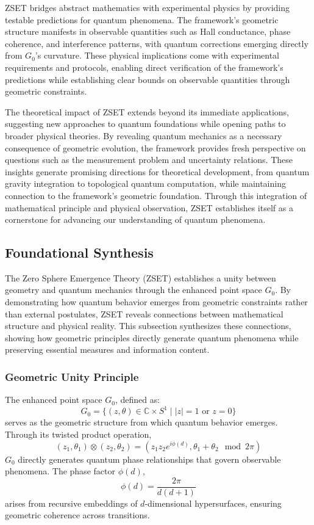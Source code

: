 \documentclass[10pt]{article}
\begin{document}
ZSET bridges abstract mathematics with experimental physics by providing testable predictions for quantum phenomena. The framework's geometric structure manifests in observable quantities such as Hall conductance, phase coherence, and interference patterns, with quantum corrections emerging directly from \(G_0\)'s curvature. These physical implications come with experimental requirements and protocols, enabling direct verification of the framework's predictions while establishing clear bounds on observable quantities through geometric constraints.

The theoretical impact of ZSET extends beyond its immediate applications, suggesting new approaches to quantum foundations while opening paths to broader physical theories. By revealing quantum mechanics as a necessary consequence of geometric evolution, the framework provides fresh perspective on questions such as the measurement problem and uncertainty relations. These insights generate promising directions for theoretical development, from quantum gravity integration to topological quantum computation, while maintaining connection to the framework's geometric foundation. Through this integration of mathematical principle and physical observation, ZSET establishes itself as a cornerstone for advancing our understanding of quantum phenomena.

\subsection{Foundational Synthesis}

The Zero Sphere Emergence Theory (ZSET) establishes a unity between geometry and quantum mechanics through the enhanced point space \(G_0\). By demonstrating how quantum behavior emerges from geometric constraints rather than external postulates, ZSET reveals connections between mathematical structure and physical reality. This subsection synthesizes these connections, showing how geometric principles directly generate quantum phenomena while preserving essential measures and information content.

\subsubsection{Geometric Unity Principle}

The enhanced point space \(G_0\), defined as:
\[
G_0 = \{(z, \theta) \in \mathbb{C} \times S^1 \mid |z| = 1 \text{ or } z = 0\}
\]
serves as the geometric structure from which quantum behavior emerges. Through its twisted product operation,
\[
(z_1, \theta_1) \otimes (z_2, \theta_2) = \left(z_1 z_2 e^{i\phi(d)}, \theta_1 + \theta_2 \mod 2\pi\right)
\]
\(G_0\) directly generates quantum phase relationships that govern observable phenomena. The phase factor \(\phi(d)\),
\[
\phi(d) = \frac{2\pi}{d(d+1)}
\]
arises from recursive embeddings of \(d\)-dimensional hypersurfaces, ensuring geometric coherence across transitions.
\end{document}
